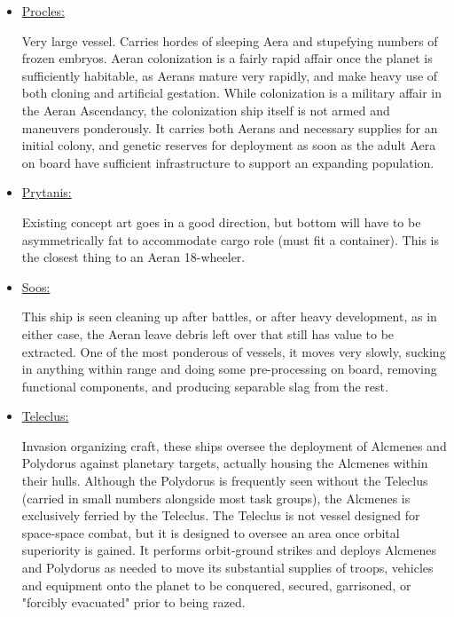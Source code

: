 \begin{itemize}
\item \href{http://vegastrike.sourceforge.net/wiki/Vessel:Procles}{Procles:}

Very large vessel. Carries hordes of sleeping Aera and stupefying
numbers of frozen embryos. Aeran colonization is a fairly rapid affair
once the planet is sufficiently habitable, as Aerans mature very
rapidly, and make heavy use of both cloning and artificial
gestation. While colonization is a military affair in the Aeran
Ascendancy, the colonization ship itself is not armed and maneuvers
ponderously. It carries both Aerans and necessary supplies for an
initial colony, and genetic reserves for deployment as soon as the
adult Aera on board have sufficient infrastructure to support an
expanding population.



\item \href{http://vegastrike.sourceforge.net/wiki/Vessel:Prytanis}{Prytanis:}

Existing concept art goes in a good direction, but bottom will have to
be asymmetrically fat to accommodate cargo role (must fit a
container). This is the closest thing to an Aeran 18-wheeler.


\item \href{http://vegastrike.sourceforge.net/wiki/Vessel:Soos}{Soos:}

This ship is seen cleaning up after battles, or after heavy
development, as in either case, the Aeran leave debris left over that
still has value to be extracted. One of the most ponderous of vessels,
it moves very slowly, sucking in anything within range and doing some
pre-processing on board, removing functional components, and producing
separable slag from the rest.



\item \href{http://vegastrike.sourceforge.net/wiki/Vessel:Teleclus}{Teleclus:}

Invasion organizing craft, these ships oversee the deployment of
Alcmenes and Polydorus against planetary targets, actually housing the
Alcmenes within their hulls. Although the Polydorus is frequently seen
without the Teleclus (carried in small numbers alongside most task
groups), the Alcmenes is exclusively ferried by the Teleclus. The
Teleclus is not vessel designed for space-space combat, but it is
designed to oversee an area once orbital superiority is gained. It
performs orbit-ground strikes and deploys Alcmenes and Polydorus as
needed to move its substantial supplies of troops, vehicles and
equipment onto the planet to be conquered, secured, garrisoned, or
"forcibly evacuated" prior to being razed.



\end{itemize}
